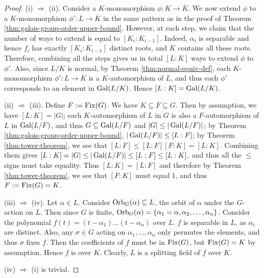 \begin{proof}
	
	
	
	(i) $\Rightarrow$ (ii). Consider a $K$-monomorphism $\phi: K \to \overline{K}$. We now extend $\phi$ to a $K$-monomorphism $\phi':L \to \overline{K}$ in the same pattern as in the proof of Theorem \ref{thm:galois-group-order-upper-bound}. However, at each step, we claim that the number of ways to extend is equal to $[K_i : K_{i-1}]$. Indeed, $\alpha_i$ is separable and hence $f_i$ has exactly $[K_i : K_{i-1}]$ distinct roots, and $\overline K$ contains all these roots. Therefore, combining all the steps gives us in total $[L:K]$ ways to extend $\phi$ to $\phi'$. Also, since $L/K$ is normal, by Theorem \ref{thm:normal-equiv-def}, each $K$-monomorphism $\phi': L \to \overline{K}$ is a $K$-automorphism of $L$, and thus each $\phi'$ corresponds to an element in $\operatorname{Gal}(L/K)$. Hence $[L:K] = \operatorname{Gal}(L/K)$. 
	
	(ii) $\Rightarrow$ (iii). Define $F:= \operatorname{Fix}(G)$. We have $K \subseteq F \subseteq G$. Then by assumption, we have $[L:K] = |G|$; each $K$-automorphism of $L$ in $G$ is also a $F$-automorphism of $L$ in $\operatorname{Gal}(L/F)$, and thus $G \subseteq \operatorname{Gal}(L / F)$ and $|G| \le |\operatorname{Gal}(L / F)|$; by Theorem \ref{thm:galois-group-order-upper-bound}, $|\operatorname{Gal}(L/F)| \le [L:F]$; by Theorem \ref{thm:tower-theorem}, we see that $ [L:F] \le [L:F][F:K] = [L:K]$. Combining them gives $
	[L:K] = |G| \le |\operatorname{Gal}(L/F)| \le  [L:F] \le [L:K],
	$
	and thus all the $\le$ signs must take equality.  
	Thus $[L:K]=[L:F]$ and therefore by Theorem \ref{thm:tower-theorem}, we see that $[F:K]$ must equal $1$, and thus $F:=\operatorname{Fix}(G) = K$.
	
	(iii) $\Rightarrow$ (iv). Let $\alpha \in L$. Consider $\operatorname{Orb}_G(\alpha) \subseteq L$, the orbit of $\alpha$ under the $G$-action on $L$. Then since $G$ is finite, $\operatorname{Orb}_G(\alpha) = \{ \alpha_1 = \alpha, \alpha_2, \ldots, \alpha_n\}$. Consider the polynomial $f(t) = (t-\alpha_1) \ldots (t-\alpha_n)$ over $L$.  $f$ is separable in $L$, as $\alpha_i$ are distinct. Also, any $\sigma \in G$ acting on $\alpha_1, \dots, \alpha_n$ only permutes the elements, and thus $\sigma$ fixes $f$. Then the coefficients of $f$ must be in $\operatorname{Fix}(G)$, but $\operatorname{Fix}(G) = K$ by assumption. Hence $f$ is over $K$. Clearly, $L$ is a splitting field of $f$ over $K$. 
	
	(iv) $\Rightarrow$ (i) is trivial.
\end{proof}


